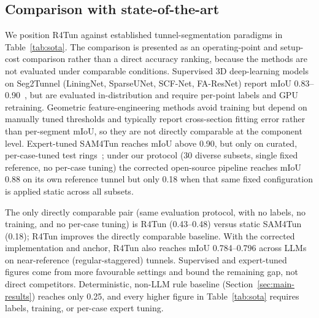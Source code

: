 \documentclass[a4paper,fleqn]{cas-dc}
\begin{document}
{%
\subsection{Comparison with state-of-the-art}\label{sec:positioning}

We position R4Tun against established tunnel-segmentation paradigms in Table~\ref{tab:sota}. The comparison is presented as an operating-point and setup-cost comparison rather than a direct accuracy ranking, because the methods are not evaluated under comparable conditions. Supervised 3D deep-learning models on Seg2Tunnel (LiningNet, SparseUNet, SCF-Net, FA-ResNet) report mIoU 0.83--0.90~\cite{lin2024seg2tunnel}, but are evaluated in-distribution and require per-point labels and GPU retraining. Geometric feature-engineering methods avoid training but depend on manually tuned thresholds and typically report cross-section fitting error rather than per-segment mIoU, so they are not directly comparable at the component level. Expert-tuned SAM4Tun reaches mIoU above 0.90, but only on curated, per-case-tuned test rings~\cite{ye2025sam4tun}; under our protocol (30 diverse subsets, single fixed reference, no per-case tuning) the corrected open-source pipeline reaches mIoU 0.88 on its own reference tunnel but only 0.18 when that same fixed configuration is applied static across all subsets.

The only directly comparable pair (same evaluation protocol, with no labels, no training, and no per-case tuning) is R4Tun (\mbox{0.43--0.48}) versus static SAM4Tun (0.18); R4Tun improves the directly comparable baseline. With the corrected implementation and anchor, R4Tun also reaches mIoU 0.784--0.796 across LLMs on near-reference (regular-staggered) tunnels. Supervised and expert-tuned figures come from more favourable settings and bound the remaining gap, not direct competitors. Deterministic, non-LLM rule baseline (Section~\ref{sec:main-results}) reaches only 0.25, and every higher figure in Table~\ref{tab:sota} requires labels, training, or per-case expert tuning.

}
\end{document}
